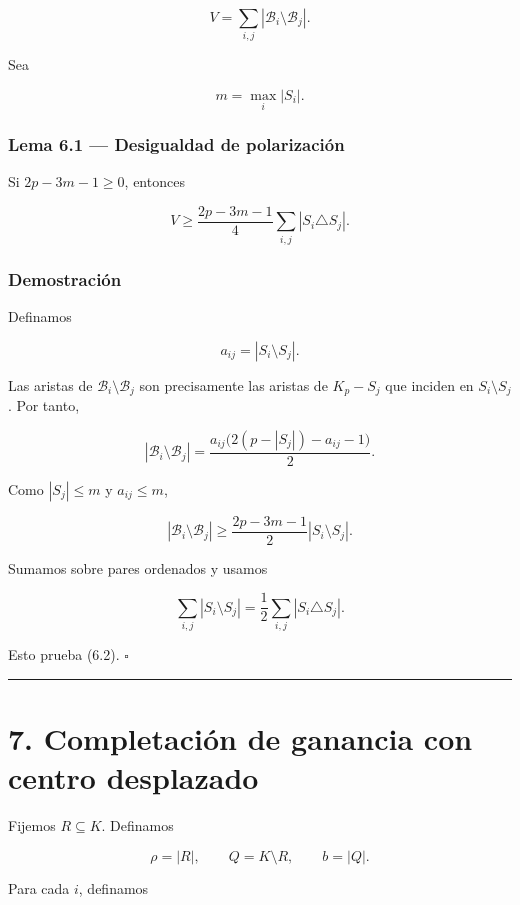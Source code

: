 \documentclass[
  spanish,
  11pt,
  a4paper,
]{article}
\begin{document}
\[
V=\sum_{i,j}|\mathcal B_i\setminus\mathcal B_j|.
\tag{6.1}
\]

Sea

\[
m=\max_i|S_i|.
\]

\subsubsection{Lema 6.1 --- Desigualdad de polarización}\label{lema-6.1-desigualdad-de-polarizaciuxf3n}

Si \(2p-3m-1\ge0\), entonces

\[
\boxed{
V
\ge
\frac{2p-3m-1}{4}
\sum_{i,j}|S_i\triangle S_j|.
}
\tag{6.2}
\]

\subsubsection{Demostración}\label{demostraciuxf3n-5}

Definamos

\[
a_{ij}=|S_i\setminus S_j|.
\]

Las aristas de \(\mathcal B_i\setminus\mathcal B_j\) son precisamente las aristas de \(K_p-S_j\) que inciden en \(S_i\setminus S_j\). Por tanto,

\[
|\mathcal B_i\setminus\mathcal B_j|
=
\frac{a_{ij}\bigl(2(p-|S_j|)-a_{ij}-1\bigr)}2.
\]

Como \(|S_j|\le m\) y \(a_{ij}\le m\),

\[
|\mathcal B_i\setminus\mathcal B_j|
\ge
\frac{2p-3m-1}{2}|S_i\setminus S_j|.
\]

Sumamos sobre pares ordenados y usamos

\[
\sum_{i,j}|S_i\setminus S_j|
=
\frac12\sum_{i,j}|S_i\triangle S_j|.
\]

Esto prueba (6.2). \(\square\)

\begin{center}\rule{0.5\linewidth}{0.5pt}\end{center}

\section{7. Completación de ganancia con centro desplazado}\label{completaciuxf3n-de-ganancia-con-centro-desplazado}

Fijemos \(R\subseteq K\). Definamos

\[
\rho=|R|,
\qquad
Q=K\setminus R,
\qquad
b=|Q|.
\]

Para cada \(i\), definamos
\end{document}
